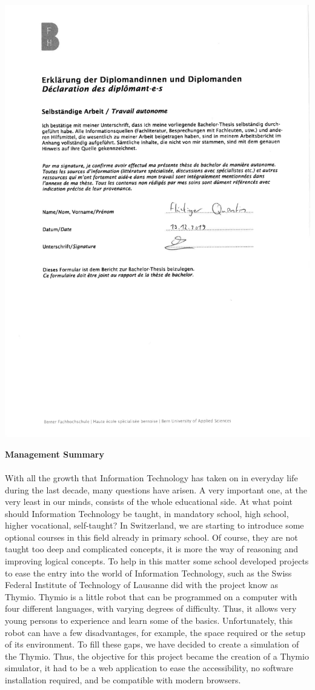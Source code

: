 \documentclass{scrbook}
\begin{document}
\includegraphics[width=\textwidth]{pdf/Declaration_of_authonomy.pdf}
\clearpage

\textbf{\large{Management Summary}}\\
\\
With all the growth that Information Technology has taken on in everyday life during the last decade, many questions have arisen. A very important one, at the very least in our minds, consists of the whole educational side. 
At what point should Information Technology be taught, in mandatory school, high school, higher vocational, self-taught? In Switzerland, we are starting to introduce some optional courses in this field already in primary school. 
Of course, they are not taught too deep and complicated concepts, it is more the way of reasoning and improving logical concepts. To help in this matter some school developed projects to ease the entry into the world of Information Technology, 
such as the Swiss Federal Institute of Technology of Lausanne did with the project know as Thymio. Thymio is a little robot that can be programmed on a computer with four different languages, with varying degrees of difficulty. 
Thus, it allows very young persons to experience and learn some of the basics. Unfortunately, this robot can have a few disadvantages, for example, the space required or the setup of its environment. 
To fill these gaps, we have decided to create a simulation of the Thymio.
Thus, the objective for this project became the creation of a Thymio simulator, it had to be a web application to ease the accessibility, no software installation required, and be compatible with modern browsers.
\end{document}
